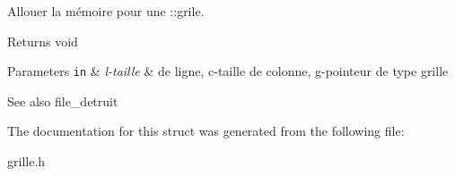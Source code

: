 Allouer la mémoire pour une \+::grile. 

\begin{DoxyReturn}{Returns}
void 
\end{DoxyReturn}

\begin{DoxyParams}[1]{Parameters}
\mbox{\tt in}  & {\em l-\/taille} & de ligne, c-\/taille de colonne, g-\/pointeur de type grille \\
\hline
\end{DoxyParams}
\begin{DoxySeeAlso}{See also}
file\+\_\+detruit 
\end{DoxySeeAlso}


The documentation for this struct was generated from the following file\+:\begin{DoxyCompactItemize}
\item 
grille.\+h\end{DoxyCompactItemize}
